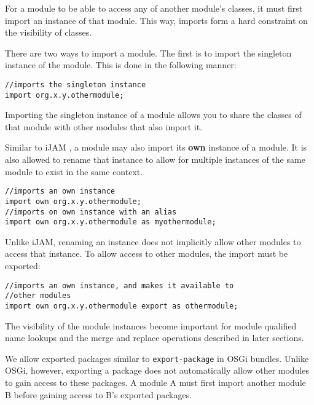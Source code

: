 
For a module to be able to access any of another module's classes,
it must first import an instance of that module. This way, imports form
a hard constraint on the visibility of classes.

There are two ways to import a module. The first is to import the singleton
instance of the module. This is done in the following manner:

\begin{lstlisting}
//imports the singleton instance
import org.x.y.othermodule;
\end{lstlisting}

Importing the singleton instance of a module allows you to share the classes
of that module with other modules that also import it.

Similar to iJAM \cite{iJAM}, a module may also import its \textbf{own} instance of
a module. It is also allowed to rename that instance to allow for multiple
instances of the same module to exist in the same context.

\begin{lstlisting}
//imports an own instance
import own org.x.y.othermodule;
//imports on own instance with an alias
import own org.x.y.othermodule as myothermodule;
\end{lstlisting}

Unlike iJAM, renaming an instance does not implicitly allow other
modules to access that instance. To allow access to other modules, the import
must be exported:

\begin{lstlisting}
//imports an own instance, and makes it available to
//other modules
import own org.x.y.othermodule export as othermodule;
\end{lstlisting}

The visibility of the module instances become important for module
qualified name lookups and the merge and replace operations described in later
sections.


We allow exported packages similar to {\tt export-package} in OSGi bundles. Unlike OSGi, however,
exporting a package does not automatically allow other modules to gain
access to these packages. A module A must first import another module B
before gaining access to B's exported packages.

